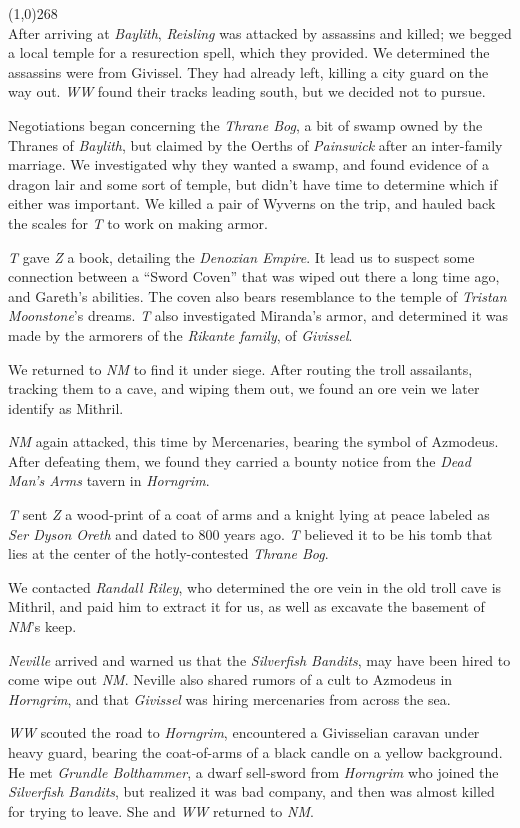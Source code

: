 \documentclass[letterpaper]{article}
\newcommand{\colline}{\noindent\line(1,0){268} \\}
\newcommand{\e}[1]{\emph{#1}}
\newcommand{\B}[1]{\textbf{#1}}
\newenvironment{notesection}[1]
{\noindent {\huge \B{#1}} \par
\vspace{-0.75em}
\colline
\begingroup\fontsize{9pt}{12pt}\selectfont}
{\endgroup}
\begin{document}
\begin{notesection}{Events}
After arriving at \e{Baylith}, \e{Reisling} was attacked by assassins and killed; we begged a local temple for a resurection spell, which they provided. We determined the assassins were from Givissel. They had already left, killing a city guard on the way out.  \e{WW} found their tracks leading south, but we decided not to pursue.

Negotiations began concerning the \e{Thrane Bog}, a bit of swamp owned by the Thranes of \e{Baylith}, but claimed by the Oerths of \e{Painswick} after an inter-family marriage.  We investigated why they wanted a swamp, and found evidence of a dragon lair and some sort of temple, but didn't have time to determine which if either was important.  We killed a pair of Wyverns on the trip, and hauled back the scales for \e{T} to work on making armor.

\e{T} gave \e{Z} a book, detailing the \e{Denoxian Empire}. It lead us to suspect some connection between a ``Sword Coven'' that was wiped out there a long time ago, and Gareth's abilities. The coven also bears resemblance to the temple of \e{Tristan Moonstone}'s dreams. \e{T} also investigated Miranda's armor, and determined it was made by the armorers of the \e{Rikante family}, of \e{Givissel}.

We returned to \e{NM} to find it under siege. After routing the troll assailants, tracking them to a cave, and wiping them out, we found an ore vein we later identify as Mithril.

\e{NM} again attacked, this time by Mercenaries, bearing the symbol of Azmodeus.  After defeating them, we found they carried a bounty notice from the \e{Dead Man's Arms} tavern in \e{Horngrim}.

\e{T} sent \e{Z} a wood-print of a coat of arms and a knight lying at peace labeled as \e{Ser Dyson Oreth} and dated to 800 years ago.  \e{T} believed it to be his tomb that lies at the center of the hotly-contested \e{Thrane Bog}.

We contacted \e{Randall Riley}, who determined the ore vein in the old troll cave is Mithril, and paid him to extract it for us, as well as excavate the basement of \e{NM}'s keep.

\e{Neville} arrived and warned us that the \e{Silverfish Bandits}, may have been hired to come wipe out \e{NM}.  Neville also shared rumors of a cult to Azmodeus in \e{Horngrim}, and that \e{Givissel} was hiring mercenaries from across the sea.

\e{WW} scouted the road to \e{Horngrim}, encountered a Givisselian caravan under heavy guard, bearing the coat-of-arms of a black candle on a yellow background.  He met \e{Grundle Bolthammer}, a dwarf sell-sword from \e{Horngrim} who joined the \e{Silverfish Bandits}, but realized it was bad company, and then was almost killed for trying to leave. She and \e{WW} returned to \e{NM}.


\end{notesection}
\end{document}
